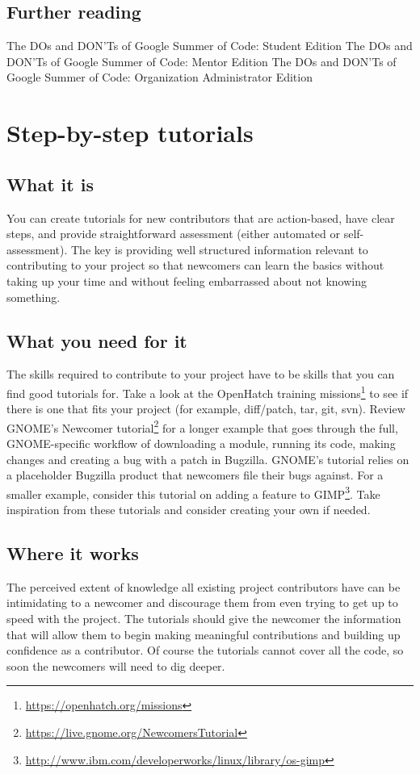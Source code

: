 \subsection{Further reading}
The DOs and DON’Ts of Google Summer of Code: Student Edition
The DOs and DON’Ts of Google Summer of Code: Mentor Edition
The DOs and DON’Ts of Google Summer of Code: Organization Administrator Edition

\section{Step-by-step tutorials}
\subsection{What it is}
You can create tutorials for new contributors that are action-based, have clear steps, and provide straightforward assessment (either automated or self-assessment). The key is providing well structured information relevant to contributing to your project so that newcomers can learn the basics without taking up your time and without feeling embarrassed about not knowing something.

\subsection{What you need for it}
The skills required to contribute to your project have to be skills that you can find good tutorials for. Take a look at the OpenHatch training missions\footnote{\url{https://openhatch.org/missions}} to see if there is one that fits your project (for example, diff/patch, tar, git, svn). Review GNOME’s Newcomer tutorial\footnote{\url{https://live.gnome.org/NewcomersTutorial}} for a longer example that goes through the full, GNOME-specific workflow of downloading a module, running its code, making changes and creating a bug with a patch in Bugzilla. GNOME’s tutorial relies on a placeholder Bugzilla product that newcomers file their bugs against. For a smaller example, consider this tutorial on adding a feature to GIMP\footnote{\url{http://www.ibm.com/developerworks/linux/library/os-gimp}}. Take inspiration from these tutorials and consider creating your own if needed.

\subsection{Where it works}
The perceived extent of knowledge all existing project contributors have can be intimidating to a newcomer and discourage them from even trying to get up to speed with the project. The tutorials should give the newcomer the information that will allow them to begin
making meaningful contributions and building up confidence as a contributor. Of course the
tutorials cannot cover all the code, so soon the newcomers will need to dig deeper.

